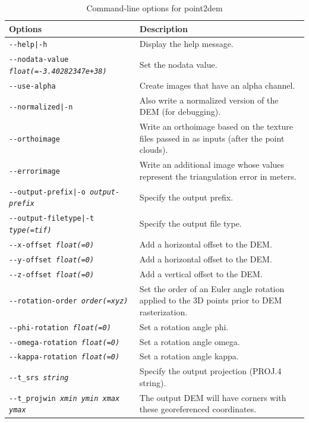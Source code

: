 \begin{longtable}{|p{8cm}|p{9cm}|}
\caption{Command-line options for point2dem}
\label{tbl:point2dem}
\endfirsthead
\endhead
\endfoot
\endlastfoot
\hline
Options & Description \\ \hline \hline
\texttt{-\/-help|-h} & Display the help message. \\ \hline
\texttt{-\/-nodata-value \textit{float(=-3.40282347e+38)}} & Set the nodata value. \\ \hline
\texttt{-\/-use-alpha} & Create images that have an alpha channel. \\ \hline
\texttt{-\/-normalized|-n} & Also write a normalized version of the \ac{DEM} (for debugging). \\ \hline
\texttt{-\/-orthoimage} & Write an orthoimage based on the texture files passed in as inputs (after the point clouds). \\ \hline
\texttt{-\/-errorimage} & Write an additional image whose values represent the triangulation error in meters. \\ \hline
\texttt{-\/-output-prefix|-o \textit{output-prefix}} & Specify the output prefix. \\ \hline
\texttt{-\/-output-filetype|-t \textit{type(=tif)}} & Specify the output file type. \\ \hline
\hline
\texttt{-\/-x-offset \textit{float(=0)}} & Add a horizontal offset to the \ac{DEM}. \\ \hline
\texttt{-\/-y-offset \textit{float(=0)}} & Add a horizontal offset to the \ac{DEM}. \\ \hline
\texttt{-\/-z-offset \textit{float(=0)}} & Add a vertical offset to the \ac{DEM}. \\ \hline
\texttt{-\/-rotation-order \textit{order(=xyz)}} & Set the order of an Euler angle rotation applied to the 3D points prior to \ac{DEM} rasterization. \\ \hline
\texttt{-\/-phi-rotation \textit{float(=0)}} & Set a rotation angle phi. \\ \hline
\texttt{-\/-omega-rotation \textit{float(=0)}} & Set a rotation angle omega. \\ \hline
\texttt{-\/-kappa-rotation \textit{float(=0)}} & Set a rotation angle kappa. \\ \hline
\hline
\texttt{-\/-t\_srs \textit{string}} & Specify the output projection (PROJ.4 string). \\ \hline
\texttt{-\/-t\_projwin \textit{xmin ymin xmax ymax} } & The output DEM will have corners with these georeferenced coordinates. \\ \hline

\end{longtable}
